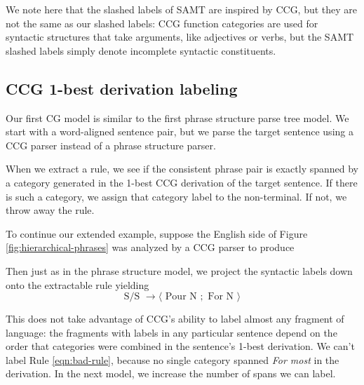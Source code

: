 \documentclass[a4paper]{article}
\begin{document}
We note here that the slashed labels of SAMT are inspired by CCG, but they are not the same as our slashed labels: CCG function categories are used for syntactic structures that take arguments, like adjectives or verbs, but the SAMT slashed labels simply denote incomplete syntactic constituents.

\subsection{CCG 1-best derivation labeling}
\label{sec:ccg-1-best}

Our first CG model is similar to the first phrase structure parse tree model. We start with a word-aligned sentence pair, but we parse the target sentence using a CCG parser instead of a phrase structure parser.

When we extract a rule, we see if the consistent phrase pair is exactly spanned by a category generated in the 1-best CCG derivation of the target sentence. If there is such a category, we assign that category label to the non-terminal. If not, we throw away the rule.

To continue our extended example, suppose the English side of Figure \ref{fig:hierarchical-phrases} was analyzed by a CCG parser to produce
\begin{center}
\end{center}
Then just as in the phrase structure model, we project the syntactic labels down onto the extractable rule yielding
\begin{equation}
\label{eqn:ccg-rule}
\textrm{S/S } \to \langle \textrm{ Pour N }; \textrm{ For N } \rangle
\end{equation}

This does not take advantage of CCG's ability to label almost any fragment of language: the fragments with labels in any particular sentence depend on the order that categories were combined in the sentence's 1-best derivation.  We can't label Rule \ref{eqn:bad-rule}, because no single category spanned {\em For most} in the derivation. In the next model, we increase the number of spans we can label.
\end{document}
